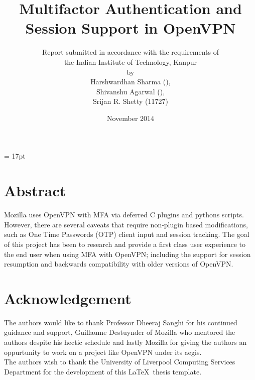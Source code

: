 \documentclass[11pt,oneside]{book}
\begin{document}
\baselineskip = 17pt

\title{Multifactor Authentication and Session Support in OpenVPN}
\author{Report submitted in accordance with the requirements of \\
the Indian Institute of Technology, Kanpur \\
by \\
Harshwardhan Sharma (),\\
Shivanshu Agarwal (),\\
Srijan R. Shetty (11727)}
\date{November 2014}
\maketitle
\frontmatter

\chapter{Abstract}
Mozilla uses OpenVPN with MFA via deferred C plugins and pythons scripts.
However, there are several caveats that require non-plugin based modifications,
such as One Time Passwords (OTP) client input and session tracking.
The goal of this project has been to research and provide a first class user experience
to the end user when using MFA with OpenVPN; including the support for session resumption
and backwards compatibility with older versions of OpenVPN.

\tableofcontents
{}

\listoffigures
{}


\chapter{Acknowledgement}
The authors would like to thank Professor Dheeraj Sanghi for his continued guidance
and support, Guillaume Destuynder of Mozilla who mentored the authors despite his
hectic schedule and lastly Mozilla for giving the authors an oppurtunity to work on
a project like OpenVPN under its aegis.\\
The authors wish to thank the University of
Liverpool Computing Services Department for the development of this
\LaTeX \ thesis template.

\printglossary
{}
\end{document}
